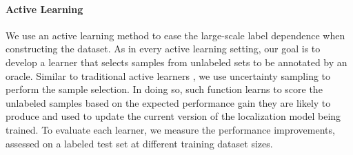\begin{table}[]
    \small
        \centering
        \caption{\small Distribution of test, train, validation, and the total dataset}
        \label{table:strategy-train-test-val-stats}
    \end{table}



\paragraph{Active Learning}
We use an active learning method to ease the large-scale label dependence when constructing the dataset. As in every active learning setting, our goal is to develop a learner that selects samples from unlabeled sets to be annotated by an oracle. Similar to traditional active learners \cite{gilad2005query,lewis1994heterogeneous}, we use uncertainty sampling to perform the sample selection. In doing so, such function learns to score the unlabeled samples based on the expected performance gain they are likely to produce and used to update the current version of the localization model being trained. To evaluate each learner, we measure the performance improvements, assessed on a labeled test set at different training dataset sizes.


